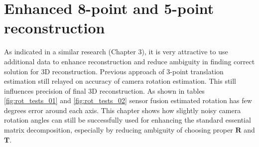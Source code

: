 \chapter{Enhanced 8-point and 5-point reconstruction}\label{chap:enh_5_8_point}
As indicated in a similar research (Chapter 3), it is very attractive to use additional data to enhance reconstruction and reduce ambiguity in finding correct solution for 3D reconstruction. Previous approach of 3-point translation estimation still relayed on accuracy of camera rotation estimation. This still influences precision of final 3D reconstruction. As shown in tables \ref{fig:rot_tests_01} and \ref{fig:rot_tests_02} sensor fusion estimated rotation has few degrees error around each axis. This chapter shows how slightly noisy camera rotation angles can still be successfully used for enhancing the standard essential matrix decomposition, especially by reducing ambiguity of choosing proper $\textbf{R}$ and $\textbf{T}$.
